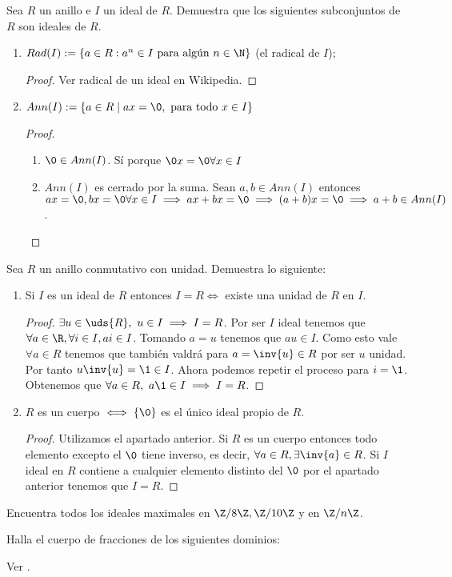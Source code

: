 \begin{ex}[H5.14]
	Sea $R$ un anillo e $I$ un ideal de $R$. Demuestra que los siguientes subconjuntos de $R$ son ideales de $R$.
	\begin{enumerate}
		\item $Rad(I):=\{a\in R:a^n \in I \text{ para algún } n \in \N\}$ (el radical de $I$);
		\begin{proof}
			Ver radical de un ideal en Wikipedia.
		\end{proof}
		\item $Ann(I):= \{a \in R \mid ax = \0, \text{ para todo } x \in I\}$
		\begin{proof}$ $ \newline
			\begin{enumerate}
				\item $\0 \in Ann(I)$. Sí porque $\0x = \0 \forall x \in I$
				\item $Ann(I)$ es cerrado por la suma. Sean $a,b \in Ann(I)$ entonces $ax = \0, bx = \0 \forall x \in I \implies ax + bx = \0 \implies (a+b)x = \0 \implies a+b \in  Ann(I)$.
			\end{enumerate}
		\end{proof}
	\end{enumerate}
\end{ex}

\begin{ex}[H5.15]
	Sea $R$ un anillo conmutativo con unidad. Demuestra lo siguiente:
	\begin{enumerate}
		\item Si $I$ es un ideal de $R$ entonces $I = R \iff$ existe una unidad de $R$ en $I$.
		\begin{proof}
			$\exists u \in \uds{R},\ u \in I \implies I = R$. Por ser $I$ ideal tenemos que $\forall a \in \R, \forall i \in I, ai \in I$. Tomando $a = u$ tenemos que $au \in I$. Como esto vale $\forall a \in R$ tenemos que también valdrá para $a = \inv{u} \in R$ por ser $u$ unidad. Por tanto $u\inv{u} = \1 \in I$. Ahora podemos repetir el proceso para $i = \1$. Obtenemos que $\forall a \in R,\ a\1 \in I \implies I = R$.
		\end{proof}
		\item $R$ es un cuerpo $\iff \{\0\}$ es el único ideal propio de $R$.
		\begin{proof}
			Utilizamos el apartado anterior. Si $R$ es un cuerpo entonces todo elemento excepto el $\0$ tiene inverso, es decir, $\forall a \in R, \exists \inv{a} \in R$. Si $I$ ideal en $R$ contiene a cualquier elemento distinto del $\0$ por el apartado anterior tenemos que $I=R$.
		\end{proof}

	\end{enumerate}
\end{ex}

\begin{ex}[H5.17]
	Encuentra todos los ideales maximales en $\Z/8\Z, \Z/10\Z$ y en $\Z/n\Z$.
\end{ex}

\begin{ex}[H5.21]
	Halla el cuerpo de fracciones de los siguientes dominios:
\end{ex}

Ver \cite[p.~208]{dor96}.

\begin{ex}[H5.22]
	
\end{ex}

